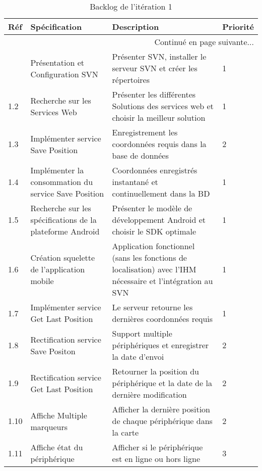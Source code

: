 \begin{center}
    \footnotesize
    \begin{longtable}{| p{1cm} | p{5cm} | p{7cm} | p{1cm} |}
        \caption{Backlog de l'itération 1}
\label{tab:sprint1-backlog} \\

        \hline
        \textbf{Réf} & \textbf{Spécification} & \textbf{Description} & \textbf{Priorité} \\ \hline
        \endhead

        \hline \multicolumn{4}{|r|}{{Continué en page suivante$\dotsc$}} \\ \hline
        \endfoot

        \hline \hline
        \endlastfoot

        \hline
1.1 & Présentation et Configuration SVN & Présenter SVN, installer le serveur SVN et créer les répertoires & 1 \\ \hline
1.2 & Recherche sur les Services Web & Présenter les différentes Solutions des services web et choisir la meilleur solution & 1 \\ \hline
1.3 & Implémenter service Save Position & Enregistrement les coordonnées requis dans la base de données & 2 \\ \hline
1.4 & Implémenter la consommation du service Save Position & Coordonnées enregistrés instantané et continuellement dans la BD & 1 \\ \hline
1.5 & Recherche sur les spécifications de la plateforme Android & Présenter le modèle de développement Android et choisir le SDK optimale & 1 \\ \hline
1.6 & Création squelette de l'application mobile & Application fonctionnel (sans les fonctions de localisation) avec l'IHM nécessaire et l'intégration au SVN & 1 \\ \hline
1.7 & Implémenter service Get Last Position & Le serveur retourne les dernières coordonnées requis & 1 \\ \hline
1.8 & Rectification service Save Positon & Support multiple périphériques et enregistrer la date d'envoi & 2 \\ \hline
1.9 & Rectification service Get Last Position & Retourner la position du périphérique et la date de la dernière modification & 2 \\ \hline
1.10 & Affiche Multiple marqueurs & Afficher la dernière position de chaque périphérique dans la carte & 2 \\ \hline
1.11 & Affiche état du périphérique & Afficher si le périphérique est en ligne ou hors ligne & 3 \\ \hline
    \end{longtable}
\end{center}

